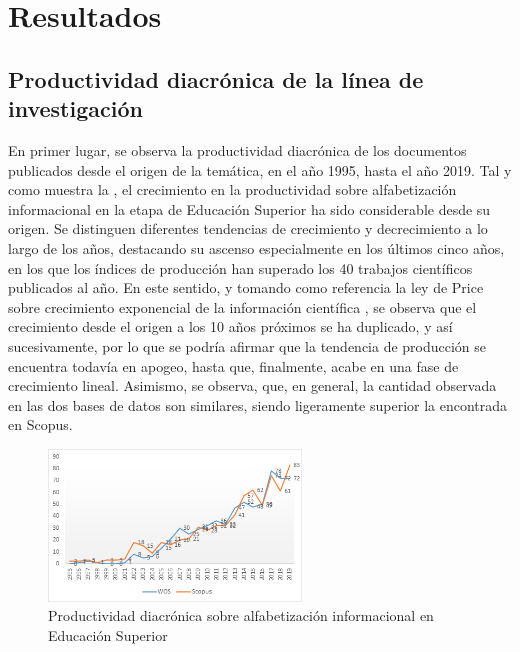 \documentclass{textolivre}
\begin{document}
\section{Resultados}
\subsection{Productividad diacrónica de la línea de investigación}
En primer lugar, se observa la productividad diacrónica de los documentos publicados desde el origen de la temática, en el año 1995, hasta el año 2019. Tal y como muestra la , el crecimiento en la productividad sobre alfabetización informacional en la etapa de Educación Superior ha sido considerable desde su origen. Se distinguen diferentes tendencias de crecimiento y decrecimiento a lo largo de los años, destacando su ascenso especialmente en los últimos cinco años, en los que los índices de producción han superado los 40 trabajos científicos publicados al año.  En este sentido, y tomando como referencia la ley de Price sobre crecimiento exponencial de la información científica \cite{price1986}, %
se observa que el crecimiento desde el origen a los 10 años próximos se ha duplicado, y así sucesivamente, por lo que se podría afirmar que la tendencia de producción se encuentra todavía en apogeo, hasta que, finalmente, acabe en una fase de crecimiento lineal. Asimismo, se observa, que, en general, la cantidad observada en las dos bases de datos son similares, siendo ligeramente superior la encontrada en Scopus.

\begin{figure}[htbp]
 \centering
 \includegraphics[width=0.6\textwidth]{fig2.png}
 \caption{Productividad diacrónica sobre alfabetización informacional en Educación Superior}
 \label{fig2}
\end{figure}
\end{document}
